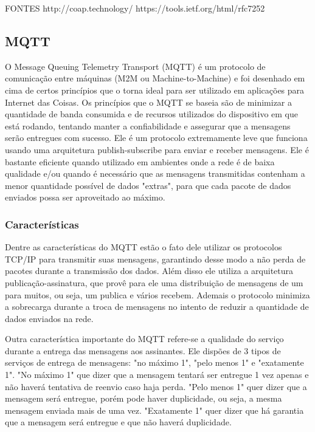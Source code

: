 FONTES
http://coap.technology/
https://tools.ietf.org/html/rfc7252


\subsection{MQTT}

O Message Queuing Telemetry Transport (MQTT) é um protocolo de comunicação entre máquinas (M2M ou Machine-to-Machine) e foi desenhado em cima de certos princípios que o torna ideal para ser utilizado em aplicações para Internet das Coisas. Os princípios que o MQTT se baseia são de minimizar a quantidade de banda consumida e de recursos utilizados do dispositivo em que está rodando, tentando manter a confiabilidade e assegurar que a mensagens serão entregues com sucesso. Ele é um protocolo extremamente leve que funciona usando uma arquitetura publish-subscribe para enviar e receber mensagens. Ele é bastante eficiente quando utilizado em ambientes onde a rede é de baixa qualidade e/ou quando é necessário que as mensagens transmitidas contenham a menor quantidade possível de dados "extras", para que cada pacote de dados enviados possa ser aproveitado ao máximo.

\subsubsection*{Características}

Dentre as características do MQTT estão o fato dele utilizar os protocolos TCP/IP para transmitir suas mensagens, garantindo desse modo a não perda de pacotes durante a transmissão dos dados. Além disso ele utiliza a arquitetura publicação-assinatura, que provê para ele uma distribuição de mensagens de um para muitos, ou seja, um publica e vários recebem. Ademais o protocolo minimiza a sobrecarga durante a troca de mensagens no intento de reduzir a quantidade de dados enviados na rede. 

Outra característica importante do MQTT refere-se a qualidade do serviço durante a entrega das mensagens aos assinantes. Ele dispões de 3 tipos de serviços de entrega de mensagens: "no máximo 1", "pelo menos 1" e "exatamente 1". "No máximo 1" que dizer que a mensagem tentará ser entregue 1 vez apenas e não haverá tentativa de reenvio caso haja perda. "Pelo menos 1" quer dizer que a mensagem será entregue, porém pode haver duplicidade, ou seja, a mesma mensagem enviada mais de uma vez. "Exatamente 1" quer dizer que há garantia que a mensagem será entregue e que não haverá duplicidade.

